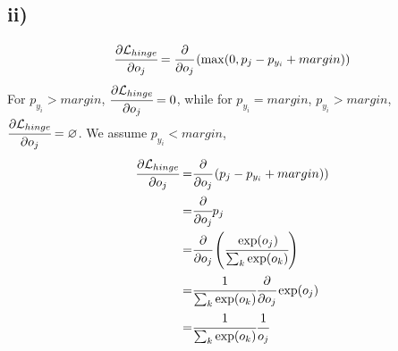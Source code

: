 \documentclass[10pt]{article}
\begin{document}
\subsection*{ii)}
\begin{align*}
\cfrac{\partial \mathcal{L}_{hinge}}{\partial o_j} = \cfrac{\partial}{\partial o_j} \left(   \max(0, p_j - p_{y_i} + margin) \right)
\end{align*}
For $p_{y_i} > margin$, $\cfrac{\partial \mathcal{L}_{hinge}}{\partial o_j} = 0$, while for $p_{y_i} = margin$, $p_{y_i} > margin$, $\cfrac{\partial \mathcal{L}_{hinge}}{\partial o_j} = \varnothing$.
We assume $p_{y_i} < margin$,
\begin{align*}
\cfrac{\partial \mathcal{L}_{hinge}}{\partial o_j} =& \cfrac{\partial}{\partial o_j} \left(   p_j - p_{y_i} + margin) \right)\\
=& \cfrac{\partial}{\partial o_j} p_j\\
=& \cfrac{\partial}{\partial o_j} \left( \cfrac{\exp(o_j)}{\sum_k \exp(o_k)} \right)\\
=& \cfrac{1}{\sum_k \exp(o_k) }\cfrac{\partial}{\partial o_j} \exp(o_j)\\
=& \cfrac{1}{\sum_k \exp(o_k) } \cfrac{1}{o_j}\\
\end{align*}
\end{document}
